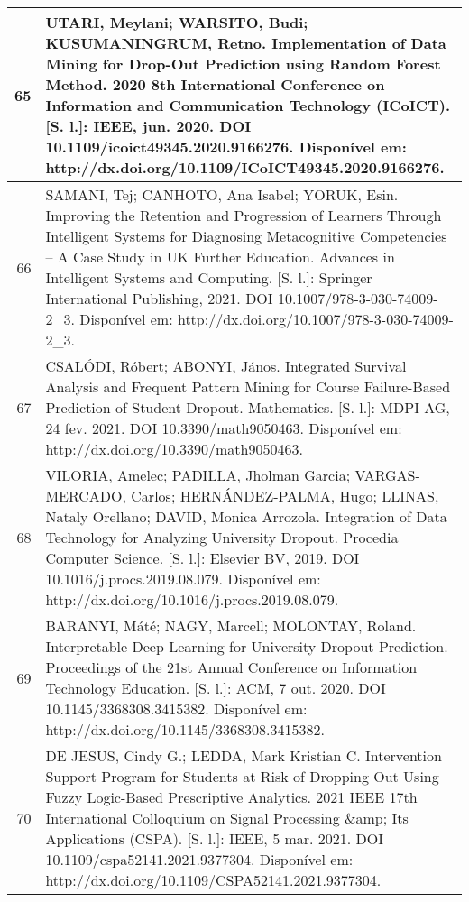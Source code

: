 \begin{apendicesenv}
\begin{longtable}[c]{|r|l|}
65 &
  \multicolumn{1}{p{14.5cm}|}{UTARI, Meylani; WARSITO, Budi; KUSUMANINGRUM, Retno. Implementation of Data Mining for Drop-Out Prediction using Random Forest Method. 2020 8th International Conference on Information and Communication Technology (ICoICT). {[}S. l.{]}: IEEE, jun. 2020. DOI 10.1109/icoict49345.2020.9166276. Disponível em: http://dx.doi.org/10.1109/ICoICT49345.2020.9166276.} \\ \hline
66 &
  \multicolumn{1}{p{14.5cm}|}{SAMANI, Tej; CANHOTO, Ana Isabel; YORUK, Esin. Improving the Retention and Progression of Learners Through Intelligent Systems for Diagnosing Metacognitive Competencies – A Case Study in UK Further Education. Advances in Intelligent Systems and Computing. {[}S. l.{]}: Springer International Publishing, 2021. DOI 10.1007/978-3-030-74009-2\_3. Disponível em: http://dx.doi.org/10.1007/978-3-030-74009-2\_3.} \\ \hline
67 &
  \multicolumn{1}{p{14.5cm}|}{CSALÓDI, Róbert; ABONYI, János. Integrated Survival Analysis and Frequent Pattern Mining for Course Failure-Based Prediction of Student Dropout. Mathematics. {[}S. l.{]}: MDPI AG, 24 fev. 2021. DOI 10.3390/math9050463. Disponível em: http://dx.doi.org/10.3390/math9050463.} \\ \hline
68 &
  \multicolumn{1}{p{14.5cm}|}{VILORIA, Amelec; PADILLA, Jholman Garcia; VARGAS-MERCADO, Carlos; HERNÁNDEZ-PALMA, Hugo; LLINAS, Nataly Orellano; DAVID, Monica Arrozola. Integration of Data Technology for Analyzing University Dropout. Procedia Computer Science. {[}S. l.{]}: Elsevier BV, 2019. DOI 10.1016/j.procs.2019.08.079. Disponível em: http://dx.doi.org/10.1016/j.procs.2019.08.079.} \\ \hline
69 &
  \multicolumn{1}{p{14.5cm}|}{BARANYI, Máté; NAGY, Marcell; MOLONTAY, Roland. Interpretable Deep Learning for University Dropout Prediction. Proceedings of the 21st Annual Conference on Information Technology Education. {[}S. l.{]}: ACM, 7 out. 2020. DOI 10.1145/3368308.3415382. Disponível em: http://dx.doi.org/10.1145/3368308.3415382.} \\ \hline
70 &
  \multicolumn{1}{p{14.5cm}|}{DE JESUS, Cindy G.; LEDDA, Mark Kristian C. Intervention Support Program for Students at Risk of Dropping Out Using Fuzzy Logic-Based Prescriptive Analytics. 2021 IEEE 17th International Colloquium on Signal Processing \&amp; Its Applications (CSPA). {[}S. l.{]}: IEEE, 5 mar. 2021. DOI 10.1109/cspa52141.2021.9377304. Disponível em: http://dx.doi.org/10.1109/CSPA52141.2021.9377304.} \\ \hline

\end{longtable}
\end{apendicesenv}
